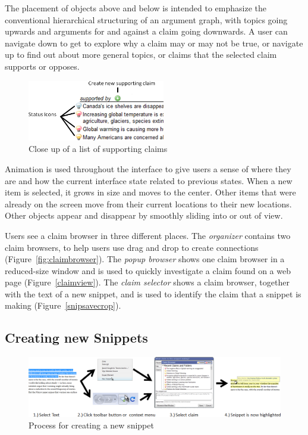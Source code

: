 \documentclass{chi2009}
\begin{document}
The placement of objects above and below is intended to emphasize the conventional hierarchical structuring of an argument graph, with topics going upwards and arguments for and against a claim going downwards. A user can navigate down to get to explore why a claim may or may not be true, or navigate up to find out about more general topics, or claims that the selected claim supports or opposes.

\begin{figure}[tb]
	\begin{center}
	\includegraphics[width=6cm]{../screenshots/claimbrowse_zoom.png}
	\caption{Close up of a list of supporting claims}
	\label{claimbrowse_zoom}
	\end{center}
\end{figure}

Animation is used throughout the interface to give users a sense of where they are and how the current interface state related to previous states. When a new item is selected, it grows in size and moves to the center. Other items that were already on the screen move from their current locations to their new locations. Other objects appear and disappear by smoothly sliding into or out of view. 

Users see a claim browser in three different places. The {\it organizer} contains two claim browsers, to help users use drag and drop to create connections (Figure~\ref{fig:claimbrowser}). The {\it popup browser} shows one claim browser in a reduced-size window and is used to quickly investigate a claim found on a web page (Figure~\ref{claimview}). The {\it claim selector} shows a claim browser, together with the text of a new snippet, and is used to identify the claim that a snippet is making (Figure~\ref{snipsavecrop}).


\subsection{Creating new Snippets}
\label{newsnippet}

\begin{figure}[tb]
	\begin{center}
	\includegraphics[width=16cm]{../screenshots/newsnip_all.png}
	\caption{Process for creating a new snippet}
	\label{createprocess}
	\end{center}
\end{figure}
\end{document}
